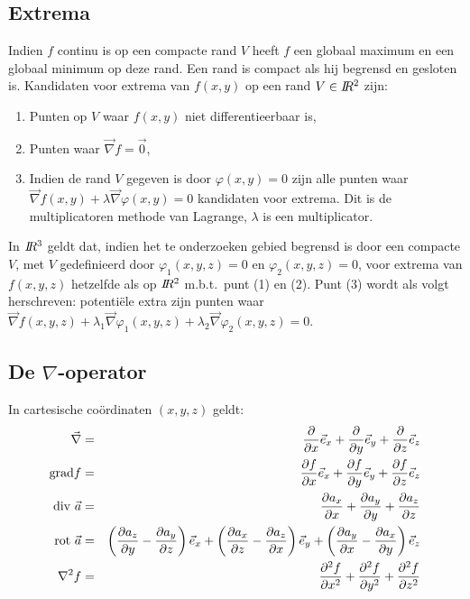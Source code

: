 \documentclass[twoside]{report}
\begin{document}
\subsection{Extrema}
Indien $f$ continu is op een compacte rand $V$ heeft $f$ een globaal
maximum en een globaal minimum op deze rand. Een rand is compact als hij
begrensd en gesloten is.
\npar
Kandidaten voor extrema van $f(x,y)$ op een rand $V\in I\hspace{-1mm}R^2$ zijn:
\begin{enumerate}
\item Punten op $V$ waar $f(x,y)$ niet differentieerbaar is,
\item Punten waar $\vec{\nabla}f=\vec{0}$,
\item Indien de rand $V$ gegeven is door $\varphi(x,y)=0$ zijn alle punten
      waar $\vec{\nabla}f(x,y)+\lambda\vec{\nabla}\varphi(x,y)=0$ kandidaten
      voor extrema. Dit is de multiplicatoren methode van Lagrange, $\lambda$
      is een multiplicator.
\end{enumerate}
In $I\hspace{-1mm}R^3$ geldt dat, indien het te onderzoeken gebied begrensd is door
een compacte $V$, met $V$ gedefinieerd door $\varphi_1(x,y,z)=0$ en
$\varphi_2(x,y,z)=0$, voor extrema van $f(x,y,z)$ hetzelfde als op $I\hspace{-1mm}R^2$
m.b.t.\ punt (1) en (2). Punt (3) wordt als volgt herschreven: potenti\"ele
extra zijn punten waar
$\vec{\nabla}f(x,y,z)+\lambda_1\vec{\nabla}\varphi_1(x,y,z)+\lambda_2\vec{\nabla}\varphi_2(x,y,z)=0$.

\subsection{De $\nabla$-operator}
In cartesische co\"ordinaten $(x,y,z)$ geldt:
\begin{eqnarray*}
\vec{\nabla}     &=&\frac{\partial }{\partial x}\vec{e}_{x}+\frac{\partial }{\partial y}\vec{e}_{y}+\frac{\partial }{\partial z}\vec{e}_{z}\\
{\rm grad}f      &=&\frac{\partial f}{\partial x}\vec{e}_{x}+\frac{\partial f}{\partial y}\vec{e}_{y}+\frac{\partial f}{\partial z}\vec{e}_{z}\\
{\rm div}~\vec{a}&=&\frac{\partial a_x}{\partial x}+\frac{\partial a_y}{\partial y}+\frac{\partial a_z}{\partial z}\\
{\rm rot}~\vec{a}&=&\left(\frac{\partial a_z}{\partial y}-\frac{\partial a_y}{\partial z}\right)\vec{e}_{x}+
                    \left(\frac{\partial a_x}{\partial z}-\frac{\partial a_z}{\partial x}\right)\vec{e}_{y}+
                    \left(\frac{\partial a_y}{\partial x}-\frac{\partial a_x}{\partial y}\right)\vec{e}_{z}\\
\nabla^2 f       &=&\frac{\partial^2 f}{\partial x^2}+\frac{\partial^2 f}{\partial y^2}+\frac{\partial^2 f}{\partial z^2}
\end{eqnarray*}
\end{document}
